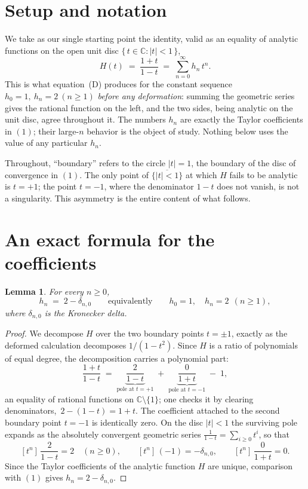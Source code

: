 \documentclass[11pt, fleqn]{amsart}
\newtheorem{lemma}[theorem]{Lemma}
\theoremstyle{remark}
\begin{document}
\section{Setup and notation}
We take as our single starting point the identity, valid as an equality of analytic
functions on the open unit disc $\{\,t\in\mathbb{C}:|t|<1\,\}$,
\begin{equation}
H(t)\;=\;\frac{1+t}{1-t}\;=\;\sum_{n=0}^{\infty}h_n\,t^n.
\tag{1}
\end{equation}
This is what equation~(D) produces for the constant sequence $h_0=1,\ h_n=2\ (n\ge1)$
\emph{before any deformation}: summing the geometric series gives the rational function
on the left, and the two sides, being analytic on the unit disc, agree throughout it.
The numbers $h_n$ are exactly the Taylor coefficients in $(1)$; their large-$n$ behavior
is the object of study. Nothing below uses the value of any particular $h_n$.

Throughout, ``boundary'' refers to the circle $|t|=1$, the boundary of the disc of
convergence in $(1)$. The only point of $\overline{\{|t|<1\}}$ at which $H$ fails to be
analytic is $t=+1$; the point $t=-1$, where the denominator $1-t$ does not vanish, is
not a singularity. This asymmetry is the entire content of what follows.

\section{An exact formula for the coefficients}

\begin{lemma}\label{lem:exact}
For every $n\ge 0$,
\[
h_n\;=\;2-\delta_{n,0}
\qquad\text{equivalently}\qquad
h_0=1,\quad h_n=2\ \ (n\ge1),
\]
where $\delta_{n,0}$ is the Kronecker delta.
\end{lemma}

\begin{proof}
We decompose $H$ over the two boundary points $t=\pm1$, exactly as the deformed
calculation decomposes $1/(1-t^2)$. Since $H$ is a ratio of polynomials of equal degree,
the decomposition carries a polynomial part:
\[
\frac{1+t}{1-t}
\;=\;\underbrace{\frac{2}{1-t}}_{\text{pole at }t=+1}
\;+\;\underbrace{\frac{0}{1+t}}_{\text{pole at }t=-1}
\;-\;1 ,
\]
an equality of rational functions on $\mathbb{C}\setminus\{1\}$; one checks it by
clearing denominators, $\,2-(1-t)=1+t$. The coefficient attached to the second boundary
point $t=-1$ is identically zero. On the disc $|t|<1$ the surviving pole expands as the
absolutely convergent geometric series $\frac{1}{1-t}=\sum_{i\ge0}t^{i}$, so that
\[
[t^n]\,\frac{2}{1-t}=2\quad(n\ge0),
\qquad
[t^n]\,(-1)=-\delta_{n,0},
\qquad
[t^n]\,\frac{0}{1+t}=0 .
\]
Since the Taylor coefficients of the analytic function $H$ are unique, comparison with
$(1)$ gives $h_n=2-\delta_{n,0}$.
\end{proof}
\end{document}
